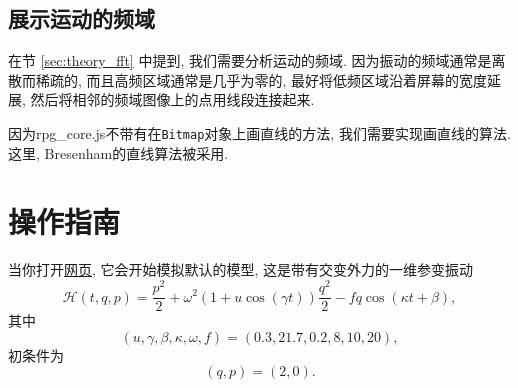 \documentclass[12pt]{article}
\begin{document}
\subsection{展示运动的频域}

在节 \ref{sec:theory_fft} 中提到,
我们需要分析运动的频域.
因为振动的频域通常是离散而稀疏的,
而且高频区域通常是几乎为零的,
最好将低频区域沿着屏幕的宽度延展,
然后将相邻的频域图像上的点用线段连接起来.

因为rpg\_core.js不带有在\texttt{Bitmap}对象上画直线的方法,
我们需要实现画直线的算法.
这里, Bresenham的直线算法被采用.

\section{操作指南}
\label{sec:program}

当你打开\href{https://UlyssesZh.github.io/rpg/mechsimul2}{网页},
它会开始模拟默认的模型,
这是带有交变外力\cite[p. 61]{landau1976mechanics}的一维参变振动\cite[p. 82]{landau1976mechanics}
\begin{equation}
  \mathcal H\left(t,q,p\right)=\frac{p^2}2+\omega^2\left(1+u\cos\left(\gamma t\right)\right)\frac{q^2}2-fq\cos\left(\kappa t+\beta\right),
\end{equation}
其中
\begin{equation*}
  \left(u,\gamma,\beta,\kappa,\omega,f\right)=\left(0.3,21.7,0.2,8,10,20\right),
\end{equation*}
初条件为
\begin{equation*}
  \left(q,p\right)=\left(2,0\right).
\end{equation*}
\end{document}

